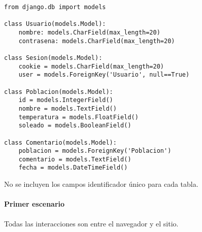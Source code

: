 \begin{verbatim}
from django.db import models

class Usuario(models.Model):
    nombre: models.CharField(max_length=20)
    contrasena: models.CharField(max_length=20)

class Sesion(models.Model):
    cookie = models.CharField(max_length=20)
    user = models.ForeignKey('Usuario', null==True)

class Poblacion(models.Model):
    id = models.IntegerField()
    nombre = models.TextField()
    temperatura = models.FloatField()
    soleado = models.BooleanField()

class Comentario(models.Model):
    poblacion = models.ForeignKey('Poblacion')
    comentario = models.TextField()
    fecha = models.DateTimeField()
\end{verbatim}

No se incluyen los campos identificador único para cada tabla.

\paragraph{Primer escenario}

Todas las interacciones son entre el navegador y el sitio.

